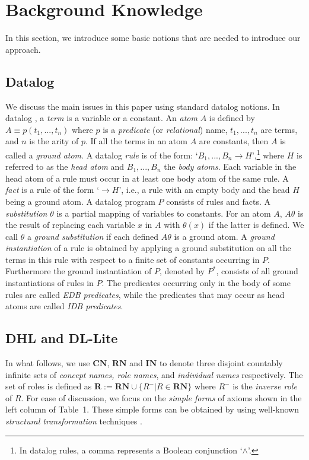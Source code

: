 \section{Background Knowledge}
\label{sec:background}

In this section, we introduce some basic notions that are needed to introduce our approach.


\subsection{Datalog}

We discuss the main issues in this paper using standard datalog notions.
In datalog \cite{database}, a \emph{term} is a variable or a constant. An \emph{atom} $A$
is defined by $A\equiv p(t_1,...,t_n)$ where $p$ is a \emph{predicate} (or \emph{relational})
name, $t_1,...,t_n$ are terms, and $n$ is the arity of $p$. If all the terms in an atom $A$ are
constants, then $A$ is called a \emph{ground atom}.
A datalog \emph{rule} is of the form: `$B_1,...,B_n\rightarrow H$',\footnote{In datalog rules, a comma
represents a Boolean conjunction `$\wedge$'.} where $H$ is referred to as
the \emph{head atom} and $B_1,...,B_n$ the \emph{body atoms}. Each variable in the head atom
of a rule must occur in at least one body atom of the same rule. A \emph{fact} is a rule of
the form `$\rightarrow H$', i.e., a rule with an empty body and the head $H$ being a ground atom.
A datalog program $P$ consists of rules and facts.
A \emph{substitution} $\theta$ is a partial mapping of variables to constants.
For an atom $A$, $A\theta$ is the result of replacing each variable $x$ in $A$
with $\theta(x)$ if the latter is defined. We call $\theta$ a \emph{ground substitution}
if each defined $A\theta$ is a ground atom.
A \emph{ground instantiation} of a rule is obtained by applying a ground substitution on all
the terms in this rule with respect to a finite set of constants occurring in $P$.
Furthermore the ground instantiation of $P$, denoted by $P^*$,
consists of all ground instantiations of rules in $P$.
The predicates occurring only in the body  of some rules are called \emph{EDB predicates},
while the predicates that may occur as head atoms are called \emph{IDB predicates}.


\subsection{DHL and DL-Lite}

In what follows, we use $\textbf{CN}$, $\textbf{RN}$ and $\textbf{IN}$
to denote three disjoint countably
infinite sets of \emph{concept names, role names}, and \emph{individual names} respectively.
The set of roles is defined as $\textbf{R}:=\textbf{RN}\cup\{R^-|R\in\textbf{RN}\}$
where $R^-$ is the \emph{inverse role} of $R$.
For ease of discussion, we focus on the \emph{simple forms} of axioms shown
in the left column of Table~1. These simple forms can be obtained by using
well-known \emph{structural transformation} techniques \cite{KrotzschRH07,Kazakov09}.

